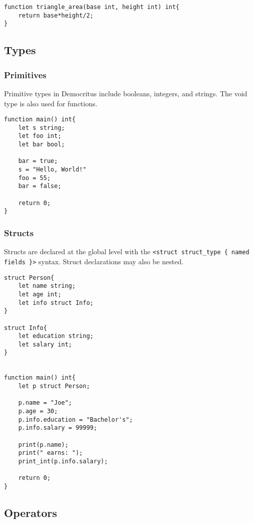 	\begin{lstlisting}
function triangle_area(base int, height int) int{
	return base*height/2;
}
	\end{lstlisting}

	\subsection{Types}

		\subsubsection{Primitives}
		Primitive types in Democritus include booleans, integers, and strings. The void type is also used for functions.

		\begin{lstlisting}
function main() int{
	let s string;
	let foo int;
	let bar bool;

	bar = true;
	s = "Hello, World!"
	foo = 55;
	bar = false;

	return 0;
}
		\end{lstlisting}


	 	\subsubsection{Structs}
	 	Structs are declared at the global level with the \texttt{<struct struct\_type \{ named fields \}>} syntax. Struct declarations may also be nested.

	 	\begin{lstlisting}
struct Person{
	let name string;
	let age int;
	let info struct Info;
}

struct Info{
	let education string;
	let salary int;
}


function main() int{
	let p struct Person;

	p.name = "Joe";
	p.age = 30;
	p.info.education = "Bachelor's";
	p.info.salary = 99999;

	print(p.name);
	print(" earns: ");
	print_int(p.info.salary);

	return 0;
}
	 	\end{lstlisting}


	\iffalse
	\subsection{Modifiers}
		Information about atomic and pointers here.
	\fi

 	\subsection{Operators}
		
